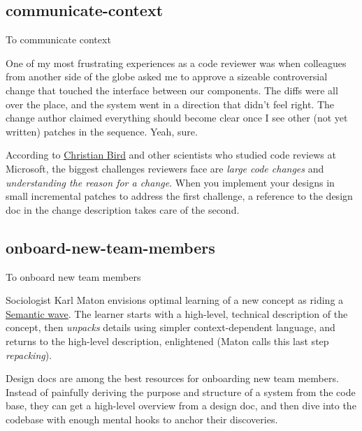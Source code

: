 \documentclass{article}
\begin{document}
\subsection{communicate-context}{To communicate context}

One of my most frustrating experiences as a code reviewer was when colleagues from another side of the globe asked me to approve a sizeable controversial change that touched the interface between our components.
The diffs were all over the place, and the system went in a direction that didn't feel right.
The change author claimed everything should become clear once I see other (not yet written) patches in the sequence.
Yeah, sure.

According to \href{https://www.cabird.com/}{Christian Bird} and other scientists who studied code reviews at Microsoft, the biggest challenges reviewers face are \emph{large code changes} and \emph{understanding the reason for a change}.
When you implement your designs in small incremental patches to address the first challenge, a reference to the design doc in the change description takes care of the second.

\subsection{onboard-new-team-members}{To onboard new team members}

Sociologist Karl Maton envisions optimal learning of a new concept as riding a \href{https://www.researchgate.net/publication/294799589_Semantic_waves_Context_complexity_and_academic_discourse}{Semantic wave}.
The learner starts with a high-level, technical description of the concept, then \emph{unpacks} details using simpler context-dependent language, and returns to the high-level description, enlightened (Maton calls this last step \emph{repacking}).

Design docs are among the best resources for onboarding new team members.
Instead of painfully deriving the purpose and structure of a system from the code base,
they can get a high-level overview from a design doc,
and then dive into the codebase with enough mental hooks to anchor their discoveries.
\end{document}
